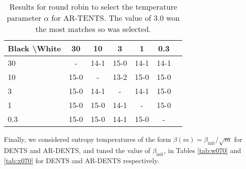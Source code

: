 \documentclass{article}
\theoremstyle{plain}
\begin{document}
\begin{appendices}
            \begin{table*}[]
            \centering
                \begin{tabular}{l|cccccc}
                    \textbf{Black \textbackslash White}     & 30  & 10   & 3   & 1    & 0.3    \\ 
                    \hline
                                            30            & -     	&  14-1 		& 15-0  		& 14-1  		& 14-1  		\\
                                            10            &  15-0 		& -     	&  13-2		& 15-0  		&  15-0 		\\
                                            3          &  15-0  	&   14-1 	&   -   &  14-1 		&  15-0 		\\
                                            1          &   	15-0	&  15-0 		&  14-1 		& -     	& 15-0  		\\
                                            0.3         &   15-0		&   	15-0	&   14-1		& 15-0  		&   -   	\\    
                \end{tabular}
                \caption{Results for round robin to select the temperature parameter $\alpha$ for AR-TENTS. The value of 3.0 won the most matches so was selected. \label{tab:x060}}
            \end{table*}
            
            
            
            
            
            
            
            
            
            
            Finally, we considered entropy temperatures of the form $\beta(m)=\beta_{\text{init}}/\sqrt{m}$ for DENTS and AR-DENTS, and tuned the value of $\beta_{\text{init}}$, in Tables \ref{tab:w070} and \ref{tab:x070} for DENTS and AR-DENTS respectively.
            

\end{appendices}
\end{document}
